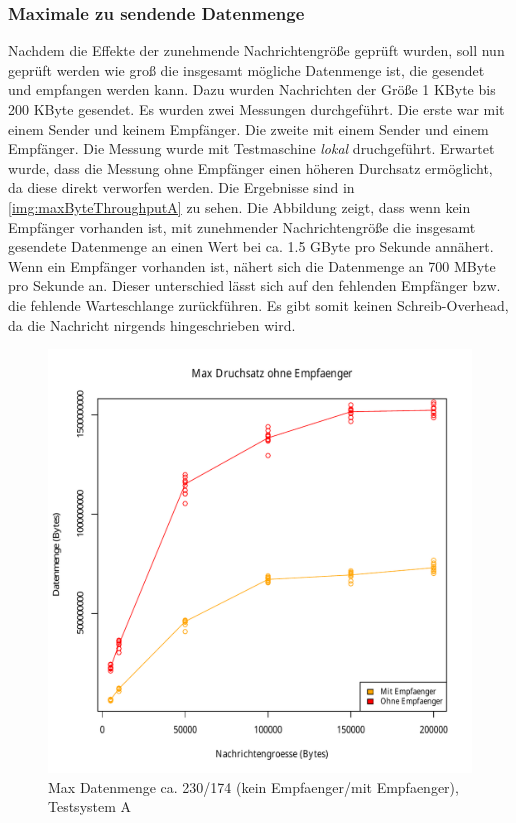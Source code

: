 \subsubsection{Maximale zu sendende Datenmenge}
\label{sec:maxthroughput}
Nachdem die Effekte der zunehmende Nachrichtengröße geprüft wurden, soll nun geprüft werden wie groß die insgesamt mögliche Datenmenge ist, die gesendet und empfangen werden kann. Dazu wurden Nachrichten der Größe 1 KByte bis 200 KByte gesendet. Es wurden zwei Messungen durchgeführt. Die erste war mit einem Sender und keinem Empfänger. Die zweite mit einem Sender und einem Empfänger. Die Messung wurde mit Testmaschine \textit{lokal} druchgeführt. Erwartet wurde, dass die Messung ohne Empfänger einen höheren Durchsatz ermöglicht, da diese direkt verworfen werden. 
Die Ergebnisse sind in \autoref{img:maxByteThroughputA} zu sehen. Die Abbildung zeigt, dass wenn kein Empfänger vorhanden ist, mit zunehmender Nachrichtengröße die insgesamt gesendete Datenmenge an einen Wert bei ca. 1.5 GByte pro Sekunde annähert. Wenn ein Empfänger vorhanden ist, nähert sich die Datenmenge an 700 MByte pro Sekunde an. Dieser unterschied lässt sich auf den fehlenden Empfänger bzw. die fehlende Warteschlange zurückführen. Es gibt somit keinen Schreib-Overhead, da die Nachricht nirgends hingeschrieben wird.
\begin{figure}
\center
  \includegraphics[width=1\textwidth]{images/measurement/rate-limit-unlimited-consumer-vs-no-consumer.pdf}
  \caption{Max Datenmenge ca. 230/174 (kein Empfaenger/mit Empfaenger), Testsystem A}
  \label{img:maxByteThroughputA}
\end{figure}

